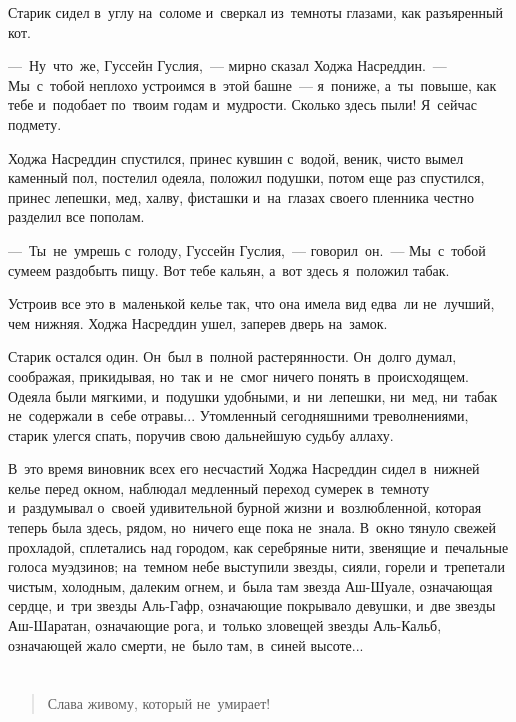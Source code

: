 \documentclass[12pt,a4paper]{book}
\begin{document}
Старик сидел в~углу на~соломе и~сверкал из~темноты глазами, как разъяренный кот.

—~Ну~что~же, Гуссейн Гуслия,~— мирно сказал Ходжа Насреддин.~— Мы~с~тобой неплохо устроимся в~этой башне~— я~пониже, а~ты~повыше, как тебе и~подобает по~твоим годам и~мудрости. Сколько здесь пыли! Я~сейчас подмету.

Ходжа Насреддин спустился, принес кувшин с~водой, веник, чисто вымел каменный пол, постелил одеяла, положил подушки, потом еще раз спустился, принес лепешки, мед, халву, фисташки и~на~глазах своего пленника честно разделил все пополам.

—~Ты~не~умрешь с~голоду, Гуссейн Гуслия,~— говорил~он.~— Мы~с~тобой сумеем раздобыть пищу. Вот тебе кальян, а~вот здесь я~положил табак.

Устроив все это в~маленькой келье так, что она имела вид едва~ли не~лучший, чем нижняя. Ходжа Насреддин ушел, заперев дверь на~замок.

Старик остался один. Он~был в~полной растерянности. Он~долго думал, соображая, прикидывая, но~так и~не~смог ничего понять в~происходящем. Одеяла были мягкими, и~подушки удобными, и~ни~лепешки, ни~мед, ни~табак не~содержали в~себе отравы... Утомленный сегодняшними треволнениями, старик улегся спать, поручив свою дальнейшую судьбу аллаху.

В~это время виновник всех его несчастий Ходжа Насреддин сидел в~нижней келье перед окном, наблюдал медленный переход сумерек в~темноту и~раздумывал о~своей удивительной бурной жизни и~возлюбленной, которая теперь была здесь, рядом, но~ничего еще пока не~знала. В~окно тянуло свежей прохладой, сплетались над городом, как серебряные нити, звенящие и~печальные голоса муэдзинов; на~темном небе выступили звезды, сияли, горели и~трепетали чистым, холодным, далеким огнем, и~была там звезда Аш-Шуале, означающая сердце, и~три звезды Аль-Гафр, означающие покрывало девушки, и~две звезды Аш-Шаратан, означающие рога, и~только зловещей звезды Аль-Кальб, означающей жало смерти, не~было там, в~синей высоте...


\part{}


\begin{quote}
Слава живому, который не~умирает!
\end{quote}

\chapter{}
\end{document}
